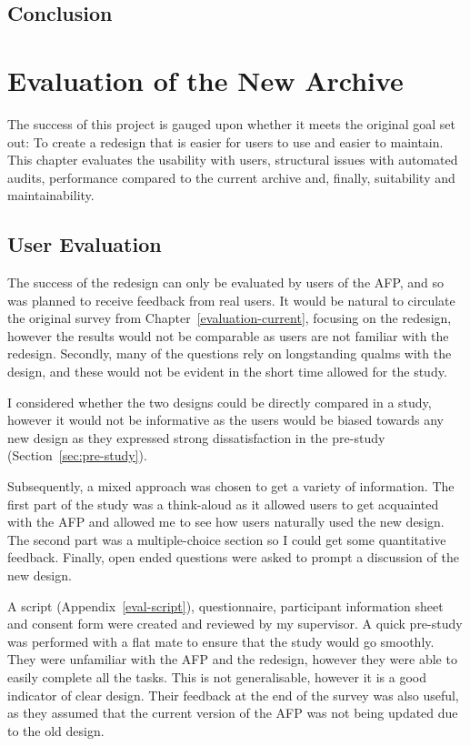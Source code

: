 \documentclass[bsc,frontabs,oneside,singlespacing,parskip,deptreport,logo]{infthesis}
\newcommand{\ijtodo}[2][]{\todo[inline,color=yellow!70,#1]{\footnotesize JF: #2}}
\begin{document}
\section{Conclusion}
\ijtodo{Needs a conclusion section.}

\chapter{Evaluation of the New Archive} \label{redesign-evaluation}
\cbstart
The success of this project is gauged upon whether it meets the original goal set out: To create a redesign that is easier for users to use and easier to maintain. This chapter evaluates the usability with users, structural issues with automated audits, performance compared to the current archive and, finally, suitability and maintainability. 
\cbend
\section{User Evaluation}

The success of the redesign can only be evaluated by users of the AFP, and so was planned to receive feedback from real users. It would be natural to circulate the original survey from Chapter~\ref{evaluation-current}, focusing on the redesign, however the results would not be comparable as users are not familiar with the redesign. Secondly, many of the questions rely on longstanding qualms with the design, and these would not be evident in the short time allowed for the study.

I considered whether the two designs could be directly compared in a study, however it would not be informative as the users would be biased towards any new design as they expressed strong dissatisfaction in the pre-study (Section~\ref{sec:pre-study}).

Subsequently, a mixed approach was chosen to get a variety of information. The first part of the study was a think-aloud as it allowed users to get acquainted with the AFP and allowed me to see how users naturally used the new design. The second part was a multiple-choice section so I could get some quantitative feedback. Finally, open ended questions were asked to prompt a discussion of the new design.

A script (Appendix~\ref{eval-script}), questionnaire, participant information sheet and consent form were created and reviewed by my supervisor. A quick pre-study was performed with a flat mate to ensure that the study would go smoothly. They were unfamiliar with the AFP and the redesign, however they were able to easily complete all the tasks. This is not generalisable, however it is a good indicator of clear design. Their feedback at the end of the survey was also useful, as they assumed that the current version of the AFP was not being updated due to the old design.
\end{document}
